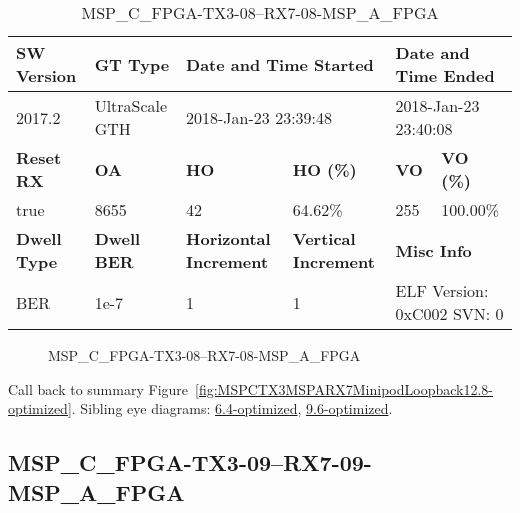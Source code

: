 \begin{table}[h]
\centering
\caption{MSP\_C\_FPGA-TX3-08--RX7-08-MSP\_A\_FPGA}
\label{tab:MSPCFPGATX308RX708MSPAFPGA12.8-optimized}
\begin{tabular}{@{}|l|l|l|l|l|l|@{}}
\toprule
\textbf{SW Version}                & \textbf{GT Type}   & \multicolumn{2}{l|}{\textbf{Date and Time Started}}            & \multicolumn{2}{l|}{\textbf{Date and Time Ended}}        \\ \midrule
2017.2                       & UltraScale GTH          & \multicolumn{2}{l|}{2018-Jan-23 23:39:48}                   & \multicolumn{2}{l|}{2018-Jan-23 23:40:08}               \\ \midrule
\textbf{Reset RX}                  & \textbf{OA} & \textbf{HO}   & \textbf{HO (\%)} & \textbf{VO} & \textbf{VO (\%)} \\ \midrule
true & 8655        & 42          & 64.62\%        & 255        & 100.00\%       \\ \midrule
\textbf{Dwell Type}                & \textbf{Dwell BER} & \textbf{Horizontal Increment} & \textbf{Vertical Increment}    & \multicolumn{2}{l|}{\textbf{Misc Info}}                  \\ \midrule
BER                            & 1e-7        & 1        & 1           & \multicolumn{2}{l|}{ELF Version: 0xC002 SVN: 0}                         \\ \bottomrule
\end{tabular}
\end{table}

\begin{figure}[h]
\caption{MSP\_C\_FPGA-TX3-08--RX7-08-MSP\_A\_FPGA} \label{fig:MSPCFPGATX308RX708MSPAFPGA12.8-optimized}
\end{figure}

Call back to summary Figure~\ref{fig:MSPCTX3MSPARX7MinipodLoopback12.8-optimized}.
Sibling eye diagrams: \hyperref[sec:MSPCFPGATX308RX708MSPAFPGA6.4-optimized]{6.4-optimized}, \hyperref[sec:MSPCFPGATX308RX708MSPAFPGA9.6-optimized]{9.6-optimized}.

\clearpage
\newpage


\subsection{MSP\_C\_FPGA-TX3-09--RX7-09-MSP\_A\_FPGA}\label{sec:MSPCFPGATX309RX709MSPAFPGA12.8-optimized}

